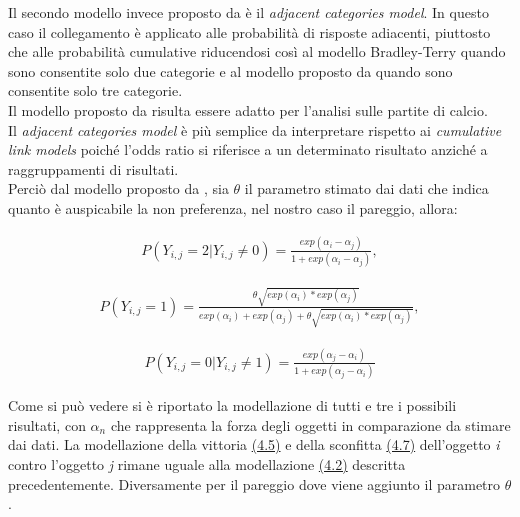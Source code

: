 Il secondo modello invece proposto da \autocite{agresti1992analysis} è il \emph{adjacent categories model}. In questo caso il collegamento è applicato alle probabilità di risposte adiacenti, piuttosto che alle probabilità cumulative riducendosi così al modello Bradley-Terry quando sono consentite solo due categorie e al modello proposto da \autocite{davidson1970extending} quando sono consentite solo tre categorie.\\
Il modello proposto da \autocite{davidson1970extending} risulta essere adatto per l'analisi sulle partite di calcio.\\
Il \emph{adjacent categories model} è più semplice da interpretare rispetto ai \emph{cumulative link models} poiché l'odds ratio si riferisce a un determinato risultato anziché a raggruppamenti di risultati. \\
Perciò dal modello proposto da \autocite{davidson1970extending}, sia $\theta$ il parametro stimato dai dati che indica quanto è auspicabile la non preferenza, nel nostro caso il pareggio, allora:

\begin{align}
	P(Y_{i,j} = 2 | Y_{i,j} \not = 0) =  \frac{exp(\alpha_{i} - \alpha_{j})}{1 + exp(\alpha_{i} - \alpha_{j})}, \label{for:4.5}
\end{align}
	
\begin{align}
	P(Y_{i,j} = 1) =  \frac{\theta \sqrt{exp(\alpha_{i}) * exp(\alpha_{j})}}{exp(\alpha_{i}) + exp(\alpha_{j}) + \theta\sqrt{exp(\alpha_{i}) * exp(\alpha_{j})}}, 
\end{align}

\begin{align}	
	P(Y_{i,j} = 0 | Y_{i,j} \not = 1) =  \frac{exp(\alpha_{j} - \alpha_{i})}{1 + exp(\alpha_{j} - \alpha_{i})}\label{for:4.7}
\end{align}

Come si può vedere si è riportato la modellazione di tutti e tre i possibili risultati, con $\alpha_{n}$ che rappresenta la forza degli oggetti in comparazione da stimare dai dati. La modellazione della vittoria \hyperref[for:4.5]{(4.5)} e della sconfitta \hyperref[for:4.7]{(4.7)} dell'oggetto \textit{i} contro l'oggetto \textit{j} rimane uguale alla modellazione \hyperref[for:3.1]{(4.2)} descritta precedentemente. Diversamente per il pareggio dove viene aggiunto il parametro $\theta$. \\

